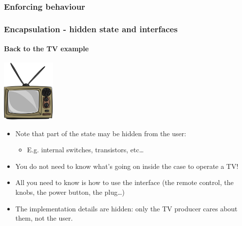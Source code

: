 \documentclass[9pt]{beamer}
\begin{document}
\begin{frame}
  \frametitle{Enforcing behaviour}
  
\end{frame}


\begin{frame}
  \frametitle{Encapsulation - hidden state and interfaces}
  \framesubtitle{Back to the TV example}
  
  \centering\includegraphics[width=0.2\textwidth]{television.png}
  
  \bigskip
  
  \begin{itemize}
  \item Note that part of the state may be hidden from the user:
    \begin{itemize}
    \item E.g. internal switches, transistors, etc\dots
    \end{itemize}
  \smallskip
  \item You do not need to know what's going on inside the case to operate a TV!
  \smallskip
  \item All you need to know is how to use the \alert{interface} (the remote
        control, the knobs, the power button, the plug\dots)
  \smallskip
  \item The \alert{implementation} details are hidden: only the TV producer cares about
        them, not the user. 
  \end{itemize}

\end{frame}
\end{document}
